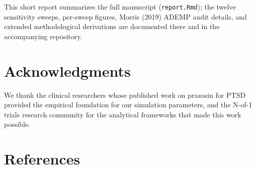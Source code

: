 \documentclass[
  11pt,
]{article}
\begin{document}
This short report summarizes the full manuscript (\texttt{report.Rmd});
the twelve sensitivity sweeps, per-sweep figures, Morris (2019)
ADEMP audit details, and extended methodological derivations
are documented there and in the accompanying repository.

\section{Acknowledgments}\label{acknowledgments}

We thank the clinical researchers whose published work on
prazosin for PTSD provided the empirical foundation for our
simulation parameters, and the N-of-1 trials research community
for the analytical frameworks that made this work possible.

\section{References}\label{references}
\end{document}
